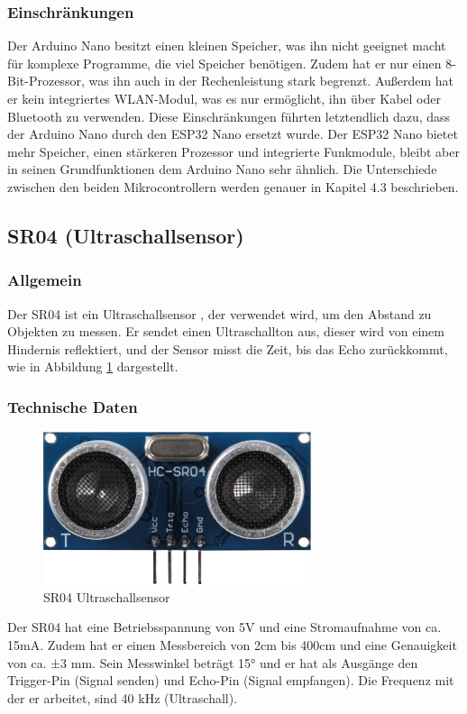 \subsubsection{Einschränkungen}
Der Arduino Nano besitzt einen kleinen Speicher, was ihn nicht geeignet macht für komplexe Programme, die viel Speicher benötigen. Zudem hat er nur einen 8-Bit-Prozessor, was ihn auch in der Rechenleistung stark begrenzt. Außerdem hat er kein integriertes WLAN-Modul, was es nur ermöglicht, ihn über Kabel oder Bluetooth zu verwenden. Diese Einschränkungen führten letztendlich dazu, dass der Arduino Nano durch den ESP32 Nano ersetzt wurde. Der ESP32 Nano bietet mehr Speicher, einen stärkeren Prozessor und integrierte Funkmodule, bleibt aber in seinen Grundfunktionen dem Arduino Nano sehr ähnlich. Die Unterschiede zwischen den beiden Mikrocontrollern werden genauer in Kapitel 4.3 beschrieben.
\subsection{SR04 (Ultraschallsensor)}
%
\subsubsection{Allgemein}
Der SR04 ist ein Ultraschallsensor \cite{sr04-datasheet},
der verwendet wird, um den Abstand zu Objekten zu messen.
%
Er sendet einen Ultraschallton aus,
dieser wird von einem Hindernis reflektiert,
und der Sensor misst die Zeit,
bis das Echo zurückkommt,
wie in Abbildung \ref{fig:sr04} dargestellt.
\subsubsection{Technische Daten}
\begin{figure}[H]
    \centering
    \includegraphics[width=0.7\textwidth]{img/Hardware/sr04.png}
    \caption{SR04 Ultraschallsensor}
    \label{fig:sr04}
\end{figure}
Der SR04 hat eine Betriebsspannung von 5V und eine Stromaufnahme von ca. 15mA.
%
Zudem hat er einen Messbereich von 2cm bis 400cm und eine Genauigkeit von ca. ±3 mm.
%
Sein Messwinkel beträgt 15°
und er hat als Ausgänge den Trigger-Pin (Signal senden) und Echo-Pin (Signal empfangen). 
%
Die Frequenz mit der er arbeitet, sind 40 kHz (Ultraschall).

